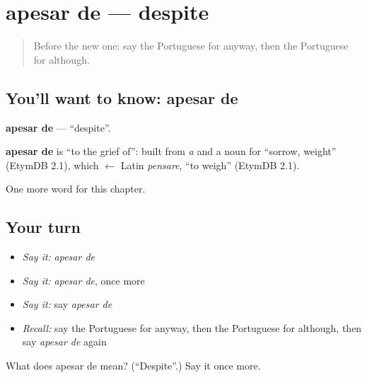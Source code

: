 \section[apesar de]{apesar de — despite}

\label{lesson:PT-C152-apesar-de}



\begin{quote}
Before the new one: say the Portuguese for anyway, then the Portuguese for although.
\end{quote}

\subsection*{You'll want to know: apesar de}
\textbf{apesar de} — \textquotedblleft{}despite\textquotedblright{}.

\begin{cousinweb}
\textbf{apesar de} is \textquotedblleft{}to the grief of\textquotedblright{}: built from \emph{a} and a noun for \textquotedblleft{}sorrow, weight\textquotedblright{} (EtymDB 2.1), which $\leftarrow$ Latin \emph{pensare}, \textquotedblleft{}to weigh\textquotedblright{} (EtymDB 2.1).
\end{cousinweb}

\begin{grammarlens}[title={What you've built}]
One more word for this chapter.
\end{grammarlens}

\subsection*{Your turn}
\begin{itemize}
\raggedright
  \item \emph{Say it:} \emph{apesar de}
  \item \emph{Say it:} \emph{apesar de}, once more
  \item \emph{Say it:} say \emph{apesar de}
  \item \emph{Recall:} say the Portuguese for anyway, then the Portuguese for although, then say \emph{apesar de} again
\end{itemize}

\begin{tcolorbox}[breakable,colback=teal!4,colframe=teal!35!black,title={Before you move on}]
What does apesar de mean? (\textquotedblleft{}Despite\textquotedblright{}.) Say it once more.
\end{tcolorbox}
